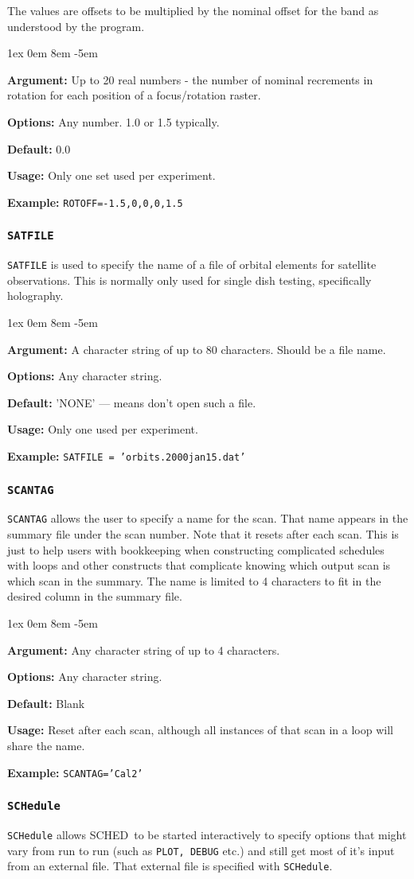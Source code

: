 \documentclass{report}
\newcommand{\schedb}{{\sc SCHED~}}
\newcommand{\rcwbox}[5]{
  \begin{list}{}{\parsep 1ex  \itemsep 0em
                 \leftmargin 8em  \itemindent -5em }
    \item {\bf Argument:} #1
    \item {\bf Options:}  #2
    \item {\bf Default:}  #3
    \item {\bf Usage:}    #4
    \item {\bf Example:}  #5
  \end{list}
}
\begin{document}
The values are offsets to be multiplied by the nominal offset
for the band as understood by the program.

\rcwbox
{Up to 20 real numbers - the number of nominal recrements in
rotation for each position of a focus/rotation raster.}
{Any number.  1.0 or 1.5 typically.}
{0.0}
{Only one set used per experiment.}
{{\tt ROTOFF=-1.5,0,0,0,1.5}}

\subsubsection{\label{MP:SATFILE}\tt SATFILE}

{\tt SATFILE} is used to specify the name of a file of
orbital elements for satellite observations.  This is normally
only used for single dish testing, specifically holography.

\rcwbox
{A character string of up to 80 characters.  Should be a file name.}
{Any character string.}
{'NONE' --- means don't open such a file.}
{Only one used per experiment.}
{{\tt SATFILE = 'orbits.2000jan15.dat'}}


\subsubsection{\label{MP:SCANTAG}\tt SCANTAG}

{\tt SCANTAG} allows the user to specify a name for the scan.  That
name appears in the summary file under the scan number.  Note that
it resets after each scan.  This is just to help users with bookkeeping
when constructing complicated schedules with loops and other constructs
that complicate knowing which output scan is which scan in the
summary.  The name is limited to 4 characters to fit in the desired
column in the summary file.

\rcwbox
{Any character string of up to 4 characters.}
{Any character string.}
{Blank}
{Reset after each scan, although all instances of that scan in a
loop will share the name.}
{{\tt SCANTAG='Cal2'}}


\subsubsection{\label{MP:SCHEDULE}\tt SCHedule}

{\tt SCHedule} allows \schedb to be started interactively to
specify options that might vary from run to run (such as {\tt PLOT,
DEBUG} etc.) and still get most of it's input from an
external file.  That external file is specified with {\tt SCHedule}.
\end{document}
